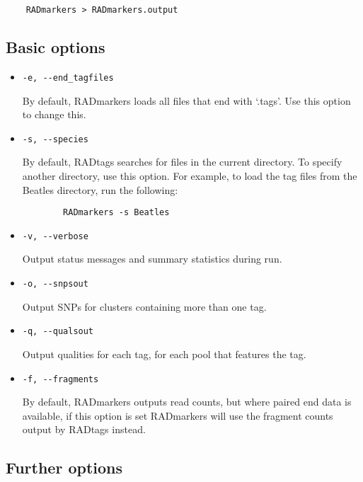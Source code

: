 \documentclass[a4paper]{article}
\begin{document}
\begin{verbatim}
    RADmarkers > RADmarkers.output
\end{verbatim}

\subsection{Basic options}

\begin{itemize}
    \item \verb|-e, --end_tagfiles|
    
    By default, RADmarkers loads all files that end with `.tags'. Use this option to change this.
    
    \item \verb|-s, --species|
    
    By default, RADtags searches for files in the current directory. To specify another directory, use this option. For example, to load the tag files from the Beatles directory, run the following:
    
    \begin{verbatim}
        RADmarkers -s Beatles
    \end{verbatim}
    
    \item \verb|-v, --verbose|
    
    Output status messages and summary statistics during run.
    
    \item \verb|-o, --snpsout|
    
    Output SNPs for clusters containing more than one tag.
    
    \item \verb|-q, --qualsout|
    
    Output qualities for each tag, for each pool that features the tag.

    \item \verb|-f, --fragments|
    
    By default, RADmarkers outputs read counts, but where paired end data is available, if this option is set RADmarkers will use the fragment counts output by RADtags instead.

\end{itemize}


\subsection{Further options}
\end{document}
